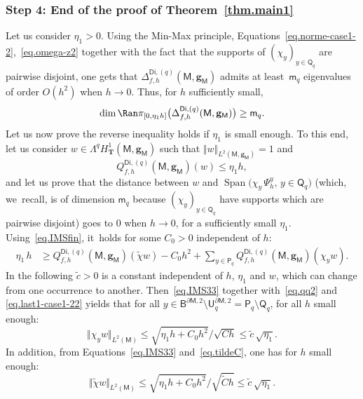 \documentclass[10pt]{amsart}
\DeclareMathOperator{\Span}{Span}
\newcommand{\mbf}[1]{\mathbf{#1}}
\let\pa\partial
\theoremstyle{plain}
\theoremstyle{definition}
\begin{document}
\subsubsection*{Step 4: End of the proof of Theorem~\ref{thm.main1}}
Let us consider $\eta_1>0$.
Using the Min-Max principle,
Equations~\eqref{eq.norme-case1-2},~\eqref{eq.omega-z2} together with
the fact that the supports of $(\chi_y)_{y\in \mathsf Q_q}$ are
pairwise disjoint, one gets that $\Delta_{f,h}^{\mathsf{Di},(q)}(\mathsf M,\mbf g_{\mathsf M})$ admits at least~$\mathsf m_q$
eigenvalues of order $O(h^{2})$ when $h\to 0$. Thus, for $h$
sufficiently small,
\[
\dim \Ran \pi_{[0,\eta_1h]}\bigl(\Delta_{f,h}^{\mathsf{Di},(q)}(\mathsf M,\mbf g_{\mathsf M})\bigr)\ge \mathsf m_q.
\]
Let us now prove the reverse inequality holds if $\eta_1$ is small enough. To this end, let us consider $w\in \Lambda^qH^1_{\mbf T}(\mathsf M,\mbf g_{\mathsf M})$ such that $\Vert w\Vert_{L^2(\mathsf M,\mbf g_{\mathsf M})}=1$ and
\[
Q_{f,h}^{\mathsf{Di},(q)}(\mathsf M,\mbf g_{\mathsf M})(w)\le \eta_1 h,
\]
and let us prove that the distance between $w$ and $\Span \bigl(\chi_y\,\Psi_h^y, \, y\in \mathsf Q_q \bigr) $ (which, we~recall, is of dimension $\mathsf m_q$ because $(\chi_y)_{y\in \mathsf Q_q}$ have supports which are pairwise disjoint)
goes to $0$ when $h\to 0$, for a sufficiently small $\eta_1$.
Using~\eqref{eq.IMSfin}, it~holds for some $C_0>0$ independent of $h$:
\begin{align}\label{eq.IMS33}
\eta_1\, h &\ge Q_{f,h}^{\mathsf{Di},(q)}(\mathsf M,\mbf g_{\mathsf M})(\tilde \chi w) -C_0 h^2 +\sum_{y\in \mathsf P_q} Q_{f,h}^{\mathsf{Di},(q)}(\mathsf M,\mbf g_{\mathsf M})(\chi_y w).
\end{align}
In the following $\tilde c>0$ is a constant independent of $h$, $\eta_1$ and $w$, which can change from one occurrence to another.
Then~\eqref{eq.IMS33} together with~\eqref{eq.qq2} and
\eqref{eq.last1-case1-22} yields that for all $y\in \mathsf B^{\pa
\mathsf M,2} \setminus \mathsf U_q^{\pa \mathsf M,2}= \mathsf
P_q\setminus \mathsf Q_q$, for all $h$ small enough:
\begin{equation}\label{eq.est-norm1}
\Vert \chi_y w\Vert_{L^2(\mathsf M)}\le \sqrt {\eta_1h +C_0h^2 }/{\sqrt{C h }} \le \tilde c \, {\sqrt{\eta_1}}.
\end{equation}
In addition, from Equations~\eqref{eq.IMS33} and~\eqref{eq.tildeC}, one has for $h$ small enough:
\begin{equation}\label{eq.est-norm2}
\Vert\tilde \chi w \Vert_{L^2(\mathsf M)}\le \sqrt {\eta_1h +C_0h^2 }/{\sqrt{\tilde C h }}\le \tilde c \, {\sqrt{\eta_1}}.
\end{equation}
\end{document}
